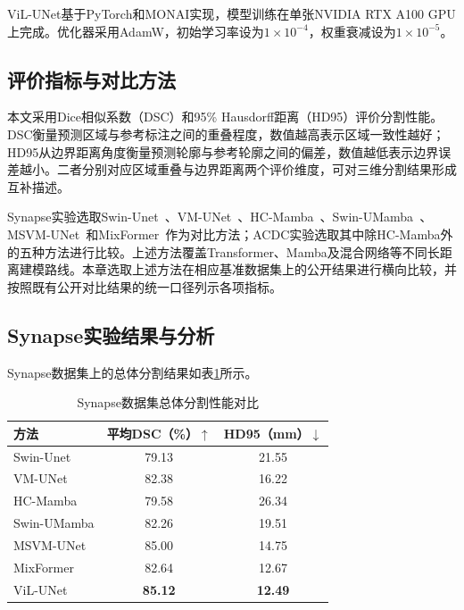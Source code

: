 ViL-UNet基于PyTorch和MONAI实现，模型训练在单张NVIDIA RTX A100 GPU上完成。优化器采用AdamW，初始学习率设为\(1\times10^{-4}\)，权重衰减设为\(1\times10^{-5}\)。


\subsection{评价指标与对比方法}

本文采用Dice相似系数（DSC）和95\% Hausdorff距离（HD95）评价分割性能。DSC衡量预测区域与参考标注之间的重叠程度，数值越高表示区域一致性越好；HD95从边界距离角度衡量预测轮廓与参考轮廓之间的偏差，数值越低表示边界误差越小。二者分别对应区域重叠与边界距离两个评价维度，可对三维分割结果形成互补描述。


Synapse实验选取Swin-Unet~\cite{cao2022swinunet}、VM-UNet~\cite{ruan2024vmunet}、HC-Mamba~\cite{xu2024hcmamba}、Swin-UMamba~\cite{liu2024swinumamba}、MSVM-UNet~\cite{chen2024msvmunet}和MixFormer~\cite{liu2025mixformer}作为对比方法；ACDC实验选取其中除HC-Mamba外的五种方法进行比较。上述方法覆盖Transformer、Mamba及混合网络等不同长距离建模路线。本章选取上述方法在相应基准数据集上的公开结果进行横向比较，并按照既有公开对比结果的统一口径列示各项指标。

\subsection{Synapse实验结果与分析}

Synapse数据集上的总体分割结果如表\ref{tab:ch3-synapse-overall}所示。

\begin{table}[htbp]
  \centering
  \caption{Synapse数据集总体分割性能对比}
  \label{tab:ch3-synapse-overall}
  \begin{tabular}{lcc}
    \hline
    方法 & 平均DSC（\%）$\uparrow$ & HD95（mm）$\downarrow$ \\
    \hline
    Swin-Unet   & 79.13 & 21.55 \\
    VM-UNet     & 82.38 & 16.22 \\
    HC-Mamba    & 79.58 & 26.34 \\
    Swin-UMamba & 82.26 & 19.51 \\
    MSVM-UNet   & 85.00 & 14.75 \\
    MixFormer   & 82.64 & 12.67 \\
    ViL-UNet    & \textbf{85.12} & \textbf{12.49} \\
    \hline
  \end{tabular}
\end{table}

